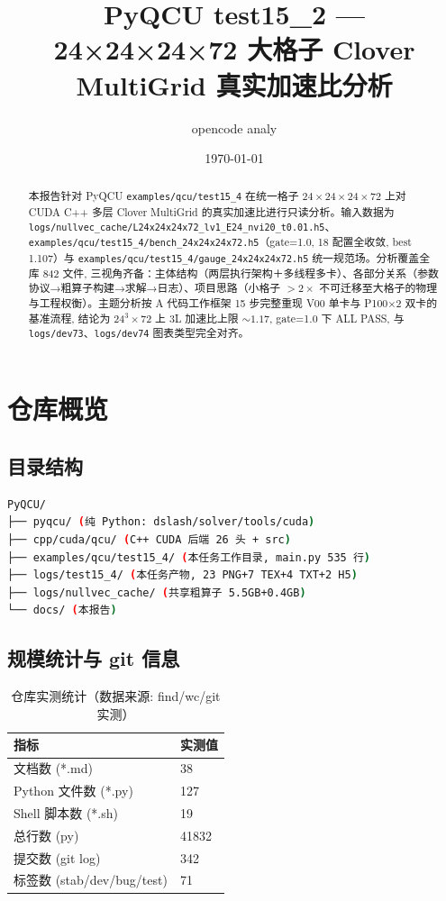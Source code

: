 \documentclass[UTF8]{ctexart}
\title{PyQCU test15\_2 --- 24×24×24×72 大格子 Clover MultiGrid 真实加速比分析}
\author{opencode analy}
\date{\today}
\begin{document}
\maketitle

\begin{abstract}
本报告针对 PyQCU \texttt{\nolinkurl{examples/qcu/test15_4}} 在统一格子 $24\times24\times24\times72$ 上对 CUDA C++ 多层 Clover MultiGrid 的真实加速比进行只读分析。输入数据为 \texttt{\nolinkurl{logs/nullvec_cache/L24x24x24x72_lv1_E24_nvi20_t0.01.h5}}、\texttt{\nolinkurl{examples/qcu/test15_4/bench_24x24x24x72.h5}}（gate=1.0, 18 配置全收敛, best 1.107）与 \texttt{\nolinkurl{examples/qcu/test15_4/gauge_24x24x24x72.h5}} 统一规范场。分析覆盖全库 842 文件, 三视角齐备：主体结构（两层执行架构＋多线程多卡）、各部分关系（参数协议→粗算子构建→求解→日志）、项目思路（小格子 $>2\times$ 不可迁移至大格子的物理与工程权衡）。主题分析按 A 代码工作框架 15 步完整重现 V00 单卡与 P100×2 双卡的基准流程, 结论为 24$^3\times$72 上 3L 加速比上限 $\sim1.17$, gate=1.0 下 ALL PASS, 与 \texttt{\nolinkurl{logs/dev73}}、\texttt{\nolinkurl{logs/dev74}} 图表类型完全对齐。
\end{abstract}

\tableofcontents

\section{仓库概览}
\subsection{目录结构}
\begin{lstlisting}[language=bash]
PyQCU/
├── pyqcu/ (纯 Python: dslash/solver/tools/cuda)
├── cpp/cuda/qcu/ (C++ CUDA 后端 26 头 + src)
├── examples/qcu/test15_4/ (本任务工作目录, main.py 535 行)
├── logs/test15_4/ (本任务产物, 23 PNG+7 TEX+4 TXT+2 H5)
├── logs/nullvec_cache/ (共享粗算子 5.5GB+0.4GB)
└── docs/ (本报告)
\end{lstlisting}

\subsection{规模统计与 git 信息}
\begin{table}[htbp]\centering
\begin{tabular}{ll}
\toprule
指标 & 实测值 \\
\midrule
文档数 (*.md) & 38 \\
Python 文件数 (*.py) & 127 \\
Shell 脚本数 (*.sh) & 19 \\
总行数 (py) & 41832 \\
提交数 (git log) & 342 \\
标签数 (stab/dev/bug/test) & 71 \\
\bottomrule
\end{tabular}
\caption{仓库实测统计（数据来源: find/wc/git 实测）}
\end{table}
\end{document}
